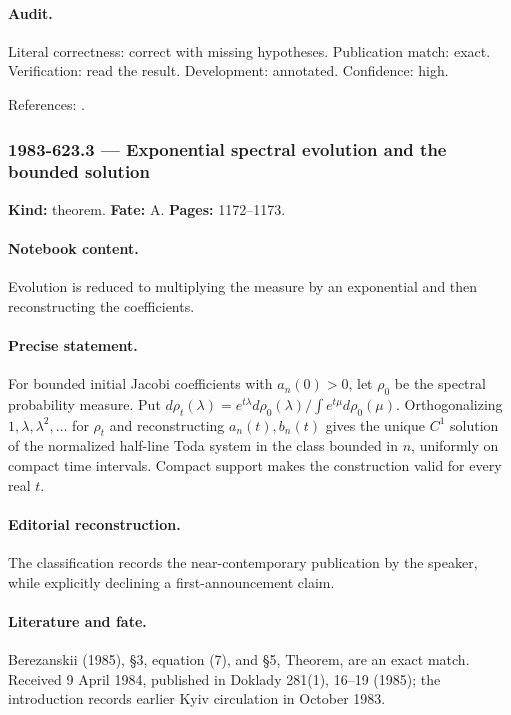 \paragraph{Audit.} Literal correctness: correct with missing hypotheses. Publication match: exact. Verification: read the result. Development: annotated. Confidence: high.

\noindent References: \citep{berezanskii1985integration}.\par

\subsubsection{1983-623.3 --- Exponential spectral evolution and the bounded solution}

\label{item:1983-623.3}

\noindent\textbf{Kind:} theorem. \textbf{Fate:} A. \textbf{Pages:} 1172--1173.\par

\paragraph{Notebook content.} Evolution is reduced to multiplying the measure by an exponential and then reconstructing the coefficients.

\paragraph{Precise statement.} For bounded initial Jacobi coefficients with \(a_n(0)>0\), let \(\rho_0\) be the spectral probability measure. Put \(d\rho_t(\lambda)=e^{t\lambda}d\rho_0(\lambda)/\int e^{t\mu}d\rho_0(\mu)\). Orthogonalizing \(1,\lambda,\lambda^2,\ldots\) for \(\rho_t\) and reconstructing \(a_n(t),b_n(t)\) gives the unique \(C^1\) solution of the normalized half-line Toda system in the class bounded in \(n\), uniformly on compact time intervals. Compact support makes the construction valid for every real \(t\).

\paragraph{Editorial reconstruction.} The classification records the near-contemporary publication by the speaker, while explicitly declining a first-announcement claim.

\paragraph{Literature and fate.} Berezanskii (1985), \S3, equation (7), and \S5, Theorem, are an exact match. Received 9 April 1984, published in Doklady 281(1), 16–19 (1985); the introduction records earlier Kyiv circulation in October 1983.

